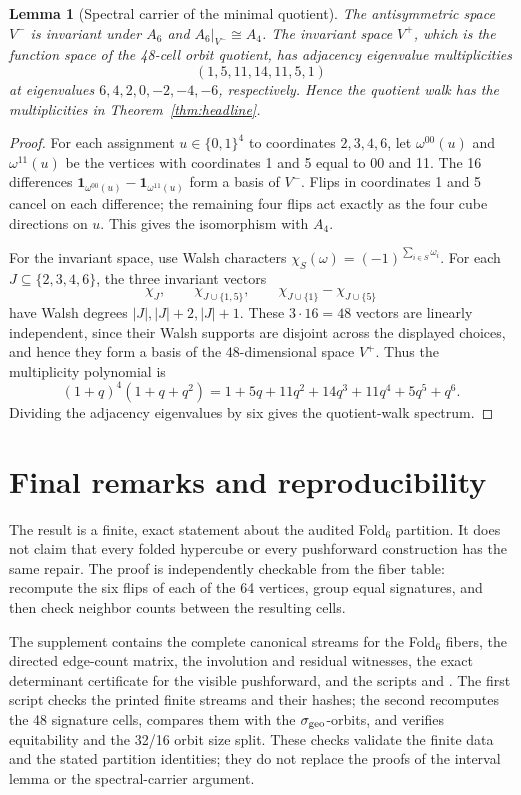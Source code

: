 \documentclass[12pt,a4paper]{article}
\theoremstyle{plain}
\newtheorem{lemma}[theorem]{Lemma}
\theoremstyle{definition}
\numberwithin{equation}{section}
\begin{document}
\begin{lemma}[Spectral carrier of the minimal quotient]\label{lem:spectral-carrier}
The antisymmetric space \(V^-\) is invariant under \(A_6\) and
\(A_6|_{V^-}\cong A_4\).  The invariant space \(V^+\), which is the function space of
the 48-cell orbit quotient, has adjacency eigenvalue multiplicities
\[
(1,5,11,14,11,5,1)
\]
at eigenvalues \(6,4,2,0,-2,-4,-6\), respectively.  Hence the quotient walk has
the multiplicities in Theorem~\ref{thm:headline}.
\end{lemma}
\begin{proof}
For each assignment \(u\in\{0,1\}^4\) to coordinates \(2,3,4,6\), let
\(\omega^{00}(u)\) and \(\omega^{11}(u)\) be the vertices with coordinates 1 and 5
equal to 00 and 11.  The 16 differences
\(\mathbf1_{\omega^{00}(u)}-\mathbf1_{\omega^{11}(u)}\) form a basis of \(V^-\).
Flips in coordinates 1 and 5 cancel on each difference; the remaining four flips act
exactly as the four cube directions on \(u\).  This gives the isomorphism with \(A_4\).

For the invariant space, use Walsh characters \(\chi_S(\omega)=(-1)^{\sum_{i\in S}\omega_i}\).
For each \(J\subseteq\{2,3,4,6\}\), the three invariant vectors
\[
\chi_J,\qquad \chi_{J\cup\{1,5\}},\qquad
\chi_{J\cup\{1\}}-\chi_{J\cup\{5\}}
\]
have Walsh degrees \(|J|,|J|+2,|J|+1\).  These \(3\cdot16=48\) vectors are linearly
independent, since their Walsh supports are disjoint across the displayed choices, and
hence they form a basis of the 48-dimensional space \(V^+\).  Thus the multiplicity
polynomial is
\[
(1+q)^4(1+q+q^2)=1+5q+11q^2+14q^3+11q^4+5q^5+q^6.
\]
Dividing the adjacency eigenvalues by six gives the quotient-walk spectrum.
\end{proof}

\section{Final remarks and reproducibility}\label{sec:final}
The result is a finite, exact statement about the audited Fold$_6$ partition.  It does
not claim that every folded hypercube or every pushforward construction has the same
repair.  The proof is independently checkable from the fiber table: recompute the six
flips of each of the 64 vertices, group equal signatures, and then check neighbor counts
between the resulting cells.

The supplement contains the complete canonical streams for the Fold$_6$ fibers, the
directed edge-count matrix, the involution and residual witnesses, the exact determinant
certificate for the visible pushforward, and the scripts
 and
.  The first script checks the printed
finite streams and their hashes; the second recomputes the 48 signature cells, compares
them with the \(\sigma_{\rm geo}\)-orbits, and verifies equitability and the 32/16 orbit
size split.  These checks validate the finite data and the stated partition identities;
they do not replace the proofs of the interval lemma or the spectral-carrier argument.
\end{document}

